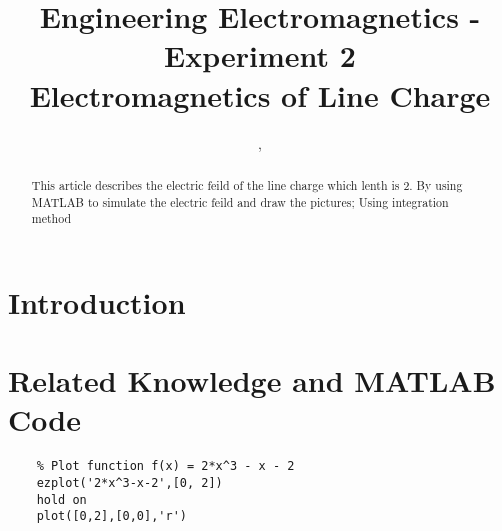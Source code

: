 \documentclass[10pt, journal]{IEEEtran}
\begin{document}
\title{Engineering Electromagnetics - Experiment 2\\ Electromagnetics of Line Charge}
\author{,
    \\

}

\maketitle

\begin{abstract}
    This article describes the electric feild of the line charge which lenth is 2.
    By using MATLAB to simulate the electric feild and draw the pictures;
    Using integration method 
\end{abstract}
\section{
  Introduction
 }
\label{sec:Intro}


\section{
  Related Knowledge and MATLAB Code
 }


% 


\begin{lstlisting}
	% Plot function f(x) = 2*x^3 - x - 2
	ezplot('2*x^3-x-2',[0, 2])
	hold on
	plot([0,2],[0,0],'r')
    \end{lstlisting}
\end{document}

